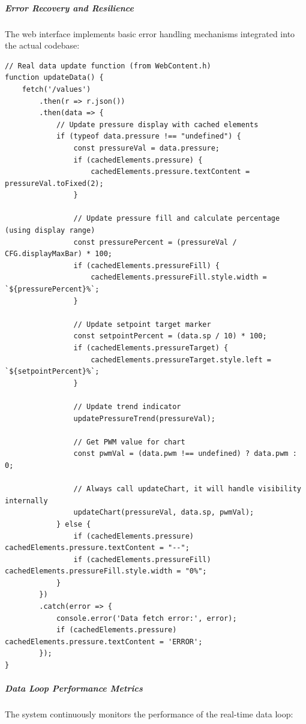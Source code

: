 \documentclass[12pt,a4paper]{article}
\begin{document}
\subparagraph{Error Recovery and Resilience}
The web interface implements basic error handling mechanisms integrated into the actual codebase:

\begin{lstlisting}[caption=Actual JavaScript Implementation - Real-time Data Loop]
// Real data update function (from WebContent.h)
function updateData() {
    fetch('/values')
        .then(r => r.json())
        .then(data => {
            // Update pressure display with cached elements
            if (typeof data.pressure !== "undefined") {
                const pressureVal = data.pressure;
                if (cachedElements.pressure) {
                    cachedElements.pressure.textContent = pressureVal.toFixed(2);
                }
                
                // Update pressure fill and calculate percentage (using display range)
                const pressurePercent = (pressureVal / CFG.displayMaxBar) * 100;
                if (cachedElements.pressureFill) {
                    cachedElements.pressureFill.style.width = `${pressurePercent}%`;
                }
                
                // Update setpoint target marker
                const setpointPercent = (data.sp / 10) * 100;
                if (cachedElements.pressureTarget) {
                    cachedElements.pressureTarget.style.left = `${setpointPercent}%`;
                }
                
                // Update trend indicator
                updatePressureTrend(pressureVal);
                
                // Get PWM value for chart
                const pwmVal = (data.pwm !== undefined) ? data.pwm : 0;
                
                // Always call updateChart, it will handle visibility internally
                updateChart(pressureVal, data.sp, pwmVal);
            } else {
                if (cachedElements.pressure) cachedElements.pressure.textContent = "--";
                if (cachedElements.pressureFill) cachedElements.pressureFill.style.width = "0%";
            }
        })
        .catch(error => {
            console.error('Data fetch error:', error);
            if (cachedElements.pressure) cachedElements.pressure.textContent = 'ERROR';
        });
}
\end{lstlisting}

\subparagraph{Data Loop Performance Metrics}
The system continuously monitors the performance of the real-time data loop:
\end{document}
